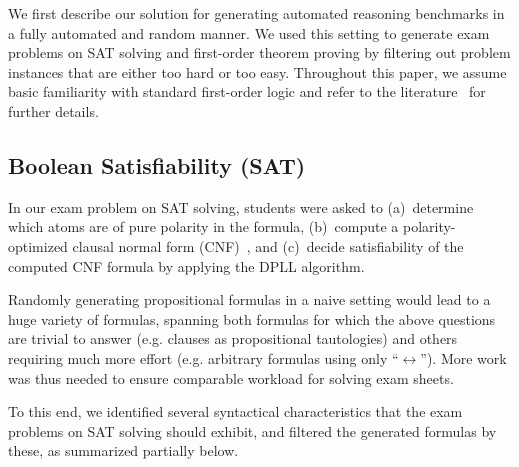We first describe our solution for generating automated reasoning
benchmarks in a fully automated and random manner. We used this
setting to generate exam problems on SAT solving and first-order
theorem proving by filtering out problem instances that are either too
hard or too easy. Throughout this paper, we assume basic familiarity with standard first-order
logic and refer to the literature~\cite{SAT09,Vampire13} for further details.


\subsection{Boolean Satisfiability (SAT)}\label{sec:sat}

In our exam problem on SAT solving, students were asked to
(a)~determine which atoms are of pure polarity in the formula,
(b)~compute a polarity-optimized clausal normal form (CNF)~\cite{Tseytin70},
and (c)~decide satisfiability of the computed CNF formula by applying the DPLL algorithm.

Randomly generating propositional formulas in a naive setting would lead
to a huge variety of formulas,
spanning both formulas for which the above questions %
are trivial to answer (e.g. clauses as propositional tautologies)
and others requiring much more effort
(e.g. arbitrary formulas using only ``$\leftrightarrow$'').
More work was thus needed to
ensure comparable workload for solving exam sheets.

To this end, we identified several  syntactical characteristics
that the exam problems on SAT solving should exhibit,
and filtered the generated formulas by these, as summarized  partially
below.
\smallskip
%

